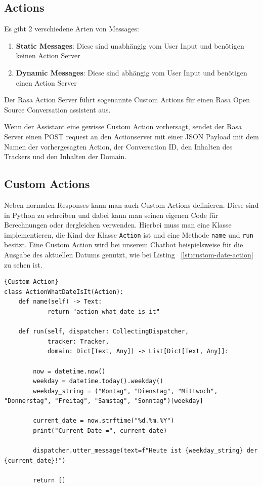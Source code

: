 \subsection{Actions}

Es gibt 2 verschiedene Arten von Messages:

\begin{enumerate}
    \item \textbf{Static Messages}: Diese sind unabhängig vom User Input und benötigen keinen Action Server\cite{actionsVid}
    \item \textbf{Dynamic Messages}: Diese sind abhängig vom User Input und benötigen einen Action Server\cite{actionsVid}
\end{enumerate}

Der Rasa Action Server führt sogenannte Custom Actions für einen Rasa Open Source Conversation assistent aus.

Wenn der Assistant eine gewisse Custom Action vorhersagt, sendet der Rasa Server einen POST request an den Actionserver mit einer JSON Payload mit dem Namen der vorhergesagten Action, der Conversation ID, den Inhalten des Trackers und den Inhalten der Domain.\cite{actions}

\subsection{Custom Actions}

Neben normalen Responses kann man auch Custom Actions definieren.
Diese sind in Python zu schreiben und dabei kann man seinen eigenen Code für Berechnungen oder dergleichen verwenden.
Hierbei muss man eine Klasse implementieren, die Kind der Klasse \texttt{Action} ist und eine Methode \texttt{name} und \texttt{run} besitzt.
Eine Custom Action wird bei unserem Chatbot beispielsweise für die Ausgabe des aktuellen Datums genutzt, wie bei Listing ~\ref{lst:custom-date-action} zu sehen ist.

\begin{lstlisting}[label={lst:custom-date-action},caption={Custom Action für die Ausgabe des aktuellen Datums}]{Custom Action}
class ActionWhatDateIsIt(Action):
    def name(self) -> Text:
            return "action_what_date_is_it"

    def run(self, dispatcher: CollectingDispatcher,
            tracker: Tracker,
            domain: Dict[Text, Any]) -> List[Dict[Text, Any]]:

        now = datetime.now()
        weekday = datetime.today().weekday()
        weekday_string = ("Montag", "Dienstag", "Mittwoch", "Donnerstag", "Freitag", "Samstag", "Sonntag")[weekday]

        current_date = now.strftime("%d.%m.%Y")
        print("Current Date =", current_date)

        dispatcher.utter_message(text=f"Heute ist {weekday_string} der {current_date}!")

        return []
\end{lstlisting}

